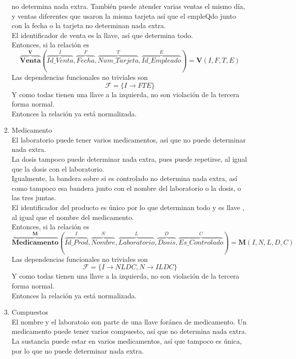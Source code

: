 \documentclass[10pt]{article}
\begin{document}
\begin{enumerate}
	no determina nada extra. También puede atender varias ventas el mismo día, y
	ventas diferentes que usaron la misma tarjeta así que el empleQdo junto con
	la fecha o la tarjeta no determinan nada extra.\\
	El identificador de venta es la llave, así que determina todo.\\
	Entonces, si la relación es 
	\[\overbrace{{\textbf{Venta}}}^{\textbf{V}} 
   (
	   \overbrace{Id\_Venta}^{I}, \overbrace{Fecha}^{F}, 
	   \overbrace{Num\_Tarjeta}^{T}, \overbrace{Id\_Empleado}^{E}
	)
	= 
	\textbf{V}(I, F, T, E)
	\]
	Las dependencias funcionales no triviales son 
	\[\mathcal{F} = \{I \rightarrow FTE\}\]
	Y como todas tienen una llave a la izquierda, no son violación de la tercera
	forma normal.\\
	Entonces la relación ya está normalizada.
	\item Medicamento \\
	El laboratorio puede tener varios medicamentos, así que no puede determinar
	nada extra. \\
	La dosis tampoco puede determinar nada extra, pues puede repetirse, al igual
	que la dosis con el laboratorio.\\
	Igualmente, la bandera sobre si es controlado no determina nada extra, así
	como tampoco esa bandera junto con el nombre del laboratorio o la dosis, o
	las tres juntas.\\
	El identificador del producto es único por lo que determinan todo y es llave
	, al igual que el nombre del medicamento.\\
	Entonces, si la relación es 
	\[\overbrace{{\textbf{Medicamento}}}^{\textbf{M}} 
   (
	   \overbrace{Id\_Prod}^{I}, \overbrace{Nombre}^{N}, 
	   \overbrace{Laboratorio}^{L}, \overbrace{Dosis}^{D},
	   \overbrace{Es\_Controlado}^{C}
	)
	= 
	\textbf{M}(I, N, L, D, C)
	\]
	Las dependencias funcionales no triviales son 
	\[\mathcal{F} = \{I \rightarrow NLDC, N \rightarrow ILDC\}\]
	Y como todas tienen una llave a la izquierda, no son violación de la tercera
	forma normal.\\
	Entonces la relación ya está normalizada.
	\item Compuestos \\
	El nombre y el laboratoio son parte de una llave foránea de medicamento. Un
	medicamento puede tener varios compuesto, así que no determina nada extra.\\
	La sustancia puede estar en varios medicamentos, así que tampoco es única,
	por lo que no puede determinar nada extra.\\

\end{enumerate}
\end{document}
